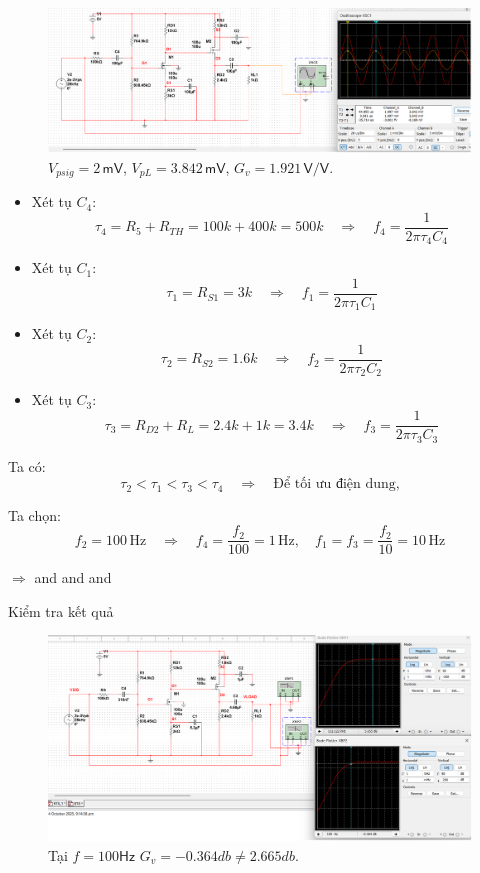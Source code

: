 
\begin{figure}[H]
	\centering
	\includegraphics[width=\linewidth]{./my-chapters/my-images/Question8/c_test.png}
	\caption{$V_{psig} = 2\,\textsf{mV}$, $V_{pL} = 3.842 \,\textsf{mV}$, $G_{v} = 1.921 \,\textsf{V/V}$.}
\end{figure}


\begin{itemize}[label=-]
	\item Xét tụ $C_4$: 
	\[
	\tau_4 = R_5 + R_{TH} = 100k + 400k = 500k 
	\quad\Rightarrow\quad 
	f_4 = \frac{1}{2\pi\tau_4 C_4}
	\]
	\item Xét tụ $C_1$: 
	\[
	\tau_1 = R_{S1} = 3k 
	\quad\Rightarrow\quad 
	f_1 = \frac{1}{2\pi\tau_1 C_1}
	\]
	\item Xét tụ $C_2$: 
	\[
	\tau_2 = R_{S2} = 1.6k 
	\quad\Rightarrow\quad 
	f_2 = \frac{1}{2\pi\tau_2 C_2}
	\]
	\item Xét tụ $C_3$: 
	\[
	\tau_3 = R_{D2} + R_L = 2.4k + 1k = 3.4k 
	\quad\Rightarrow\quad 
	f_3 = \frac{1}{2\pi\tau_3 C_3}
	\]
\end{itemize}

\noindent Ta có: 
\[
\tau_2 < \tau_1 < \tau_3 < \tau_4 
\quad\Rightarrow\quad 
\text{Để tối ưu điện dung,}
\]

\noindent Ta chọn:
\[
f_2 = 100\,\text{Hz} 
\quad\Rightarrow\quad 
f_4 = \frac{f_2}{100} = 1\,\text{Hz}, 
\quad 
f_1 = f_3 = \frac{f_2}{10} = 10\,\text{Hz}
\]

$\Rightarrow$
 and 
 and
 and  

Kiểm tra kết quả

\begin{figure}[H]
	\centering
	\includegraphics[width=.8\linewidth]{./my-chapters/my-images/Question8/d_ketqua1.png}
	\caption{Tại $f = 100 \textsf{Hz}$ $G_{v} = -0.364 db \neq 2.665 db$.}
\end{figure}

